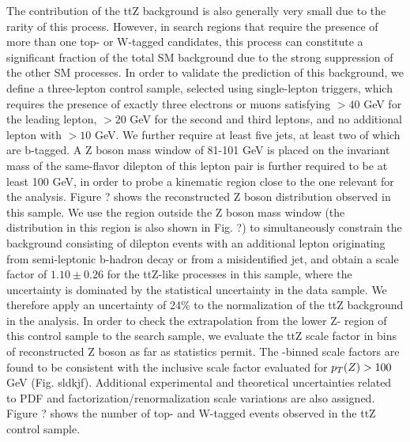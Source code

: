 The contribution of the ttZ background is also generally very small due to the rarity of this process. However, in search regions that require the presence of more than one top- or W-tagged candidates, this process can constitute a significant fraction of the total SM background due to the strong suppression of the other SM processes. In order to validate the prediction of this background, we define a three-lepton control sample, selected using single-lepton triggers, which requires the presence of exactly three electrons or muons satisfying \pt$>40$ GeV for the leading lepton, \pt$>20$ GeV for the second and third leptons, and no additional lepton with \pt$>10$ GeV. We further require at least five jets, at least two of which are b-tagged. A Z boson mass window of 81-101 GeV is placed on the invariant mass of the same-flavor dilepton \pt{} of this lepton pair is further required to be at least 100 GeV, in order to probe a kinematic region close to the one relevant for the analysis. Figure ? shows the reconstructed Z boson \pt{} distribution observed in this sample. We use the region outside the Z boson mass window (the \met{} distribution in this region is also shown in Fig. ?) to simultaneously constrain the \ttbar background consisting of dilepton \ttbar events with an additional lepton originating from semi-leptonic b-hadron decay or from a misidentified jet, and obtain a scale factor of $1.10\pm0.26$ for the ttZ-like processes in this sample, where the uncertainty is dominated by the statistical uncertainty in the data sample. We therefore apply an uncertainty of 24\% to the normalization of the ttZ background in the analysis. In order to check the extrapolation from the lower Z-\pt{} region of this control sample to the search sample, we evaluate the ttZ scale factor in bins of reconstructed Z boson \pt{} as far as statistics permit. The \pt-binned scale factors are found to be consistent with the inclusive scale factor evaluated for $p_{T}(Z)>100$ GeV (Fig. sldkjf). Additional experimental and theoretical uncertainties related to PDF and factorization/renormalization scale variations are also assigned. Figure ? shows the number of top- and W-tagged events observed in the ttZ control sample. 
